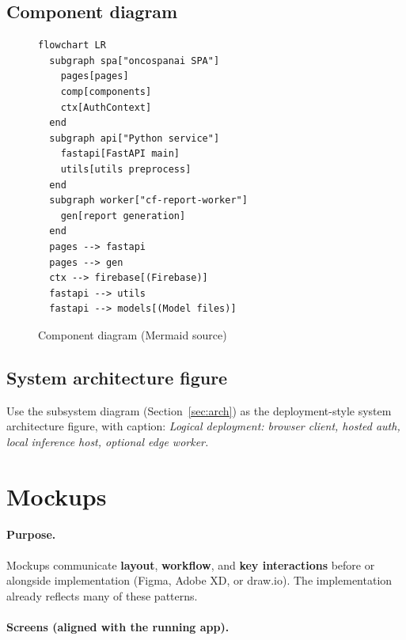 \documentclass[12pt,a4paper]{report}
\begin{document}
\subsection{Component diagram}

\begin{figure}[htbp]
  \centering
  \begin{verbatim}
flowchart LR
  subgraph spa["oncospanai SPA"]
    pages[pages]
    comp[components]
    ctx[AuthContext]
  end
  subgraph api["Python service"]
    fastapi[FastAPI main]
    utils[utils preprocess]
  end
  subgraph worker["cf-report-worker"]
    gen[report generation]
  end
  pages --> fastapi
  pages --> gen
  ctx --> firebase[(Firebase)]
  fastapi --> utils
  fastapi --> models[(Model files)]
  \end{verbatim}
  \caption{Component diagram (Mermaid source)}
\end{figure}

\subsection{System architecture figure}

Use the subsystem diagram (Section~\ref{sec:arch}) as the deployment-style system architecture figure, with caption: \textit{Logical deployment: browser client, hosted auth, local inference host, optional edge worker.}

\section{Mockups}
\label{sec:mockups}

\paragraph{Purpose.}
Mockups communicate \textbf{layout}, \textbf{workflow}, and \textbf{key interactions} before or alongside implementation (Figma, Adobe XD, or draw.io). The implementation already reflects many of these patterns.

\paragraph{Screens (aligned with the running app).}
\end{document}
